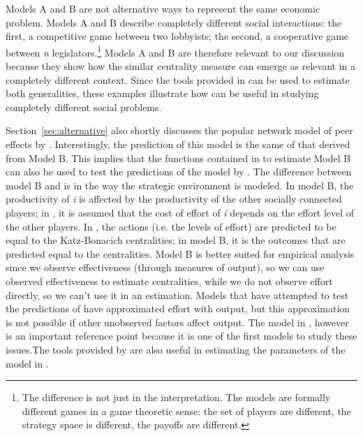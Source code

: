 \documentclass[nojss]{jss}
\begin{document}
Models A and B are not alternative ways to represent the same economic problem. Models A and B describe completely different social interactions: the first, a competitive game between two lobbyists; the second, a cooperative game between \textit{n} legislators.\footnote{The difference is not just in the interpretation. The models are formally different games in a game theoretic sense: the set of players are different, the strategy space is different, the payoffs are different.} Models A and B are therefore relevant to our discussion because they show how the similar centrality measure can emerge as relevant in a completely different context. Since the tools provided in  can be used to estimate both generalities, these examples illustrate how  can be useful in studying completely different social problems.

Section~\ref{sec:alternative} also shortly discusses the popular network model of peer effects by \cite{Ballester+Armengol+Zenou:2006}. Interestingly, the prediction of this model is the same of that derived from Model B. This implies that the functions contained in  to estimate Model B can also be used to test the predictions of the model by \cite{Ballester+Armengol+Zenou:2006}. The difference between model B and \cite{Ballester+Armengol+Zenou:2006} is in the way the strategic environment is modeled. In model B, the productivity of \textit{i} is affected by the productivity of the other socially connected players; in \cite{Ballester+Armengol+Zenou:2006}, it is assumed that the cost of effort of \textit{i} depends on the effort level of the other players. In \cite{Ballester+Armengol+Zenou:2006}, the actions (i.e. the levels of effort) are predicted to be equal to the Katz-Bonacich centralities; in model B, it is the outcomes that are predicted equal to the centralities. Model B is better suited for empirical analysis since we observe effectiveness (through measures of output), so we can use observed effectiveness to estimate centralities, while we do not observe effort directly, so we can't use it in an estimation. Models that have attempted to test the predictions of \cite{Ballester+Armengol+Zenou:2006} have approximated effort with output, but this approximation is not possible if other unobserved factors affect output. The model in \cite{Ballester+Armengol+Zenou:2006}, however is an important reference point because it is one of the first models to study these issues.The tools provided by  are also useful in estimating the parameters of the model in \cite{Ballester+Armengol+Zenou:2006}.
\end{document}
